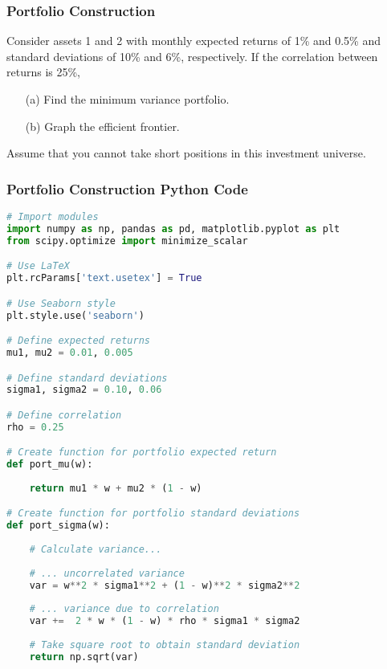 \documentclass{beamer}
\begin{document}
\begin{frame}
\frametitle{Portfolio Construction}
\begin{Example}
Consider assets 1 and 2 with monthly expected returns of 1\% and 0.5\% and standard deviations of 10\% and 6\%, respectively. If the correlation between returns is 25\%,
\begin{enumerate}
\item[(a)] Find the minimum variance portfolio.
\item[(b)] Graph the efficient frontier.
\end{enumerate}
Assume that you cannot take short positions in this investment universe.
\end{Example}

\end{frame}

\begin{frame}[fragile]
\frametitle{Portfolio Construction Python Code}

\begin{lstlisting}[language=Python]
# Import modules
import numpy as np, pandas as pd, matplotlib.pyplot as plt
from scipy.optimize import minimize_scalar

# Use LaTeX
plt.rcParams['text.usetex'] = True

# Use Seaborn style
plt.style.use('seaborn')

# Define expected returns
mu1, mu2 = 0.01, 0.005

# Define standard deviations
sigma1, sigma2 = 0.10, 0.06

# Define correlation
rho = 0.25

# Create function for portfolio expected return
def port_mu(w):
    
    return mu1 * w + mu2 * (1 - w)

# Create function for portfolio standard deviations
def port_sigma(w):
    
    # Calculate variance...
    
    # ... uncorrelated variance
    var = w**2 * sigma1**2 + (1 - w)**2 * sigma2**2 
    
    # ... variance due to correlation
    var +=  2 * w * (1 - w) * rho * sigma1 * sigma2
    
    # Take square root to obtain standard deviation
    return np.sqrt(var)
\end{lstlisting}

\end{frame}
\end{document}
